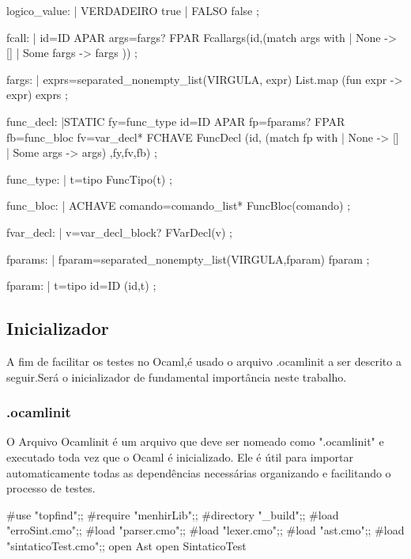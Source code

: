 \documentclass[12pt,a4paper,twoside]{report}
\begin{document}
\begin{terminal}
logico_value:
  | VERDADEIRO { true }
  | FALSO  { false }
  ;

fcall:
    | id=ID APAR args=fargs? FPAR { Fcallargs(id,(match args with
                                                  | None -> []
                                                  | Some fargs -> fargs )) }
    ;

fargs:
    | exprs=separated_nonempty_list(VIRGULA, expr) {  List.map (fun expr -> expr) exprs}
    ;

	
func_decl:
    |STATIC fy=func_type id=ID APAR fp=fparams? FPAR   fb=func_bloc  fv=var_decl* FCHAVE
   { FuncDecl (id, (match fp with
                                                                                                  | None -> []
                                                                                                  | Some args -> args)
                                                                                          ,fy,fv,fb) }
	  ;

func_type:
    |  t=tipo { FuncTipo(t) }
    ;

func_bloc:
    | ACHAVE comando=comando_list*  {FuncBloc(comando)}
    ;

fvar_decl:
    | v=var_decl_block? { FVarDecl(v) }
    ;

fparams:
    | fparam=separated_nonempty_list(VIRGULA,fparam){ fparam }
    ;

fparam:
    | t=tipo id=ID {(id,t)}
    ;

\end{terminal}
\subsection{Inicializador}
A fim de facilitar os testes no Ocaml,é usado o arquivo .ocamlinit a ser descrito a seguir.Será o inicializador de fundamental importância neste trabalho.
\subsubsection{.ocamlinit}
 O Arquivo Ocamlinit é um arquivo que deve ser nomeado como ".ocamlinit" e  executado toda vez que o Ocaml é inicializado. Ele é útil para importar automaticamente todas as dependências necessárias organizando e facilitando o processo de testes.
\begin{terminal}

#use "topfind";;
#require "menhirLib";;
#directory "_build";;
#load "erroSint.cmo";;
#load "parser.cmo";;
#load "lexer.cmo";;
#load "ast.cmo";;
#load "sintaticoTest.cmo";;
open Ast
open SintaticoTest

\end{terminal}
\end{document}

